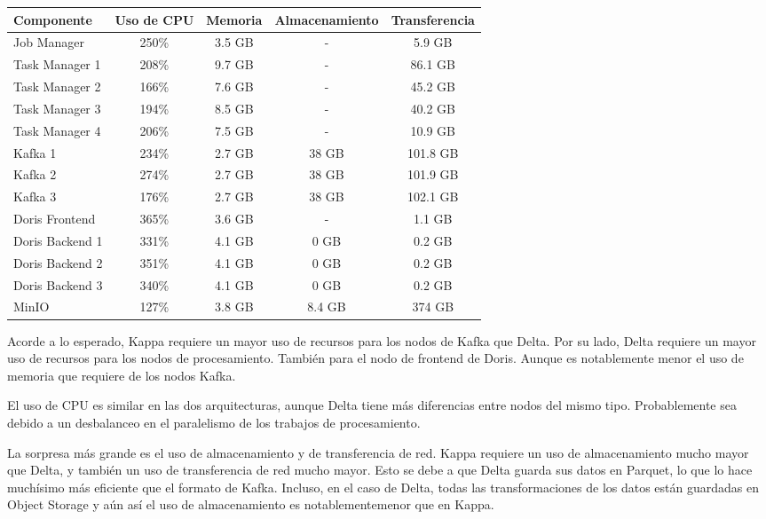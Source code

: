 \begin{longtable}{|p{3cm}|c|c|c|c|}
    \hline
    \textbf{Componente} & \textbf{Uso de CPU} & \textbf{Memoria} & \textbf{Almacenamiento} & \textbf{Transferencia} \\
    \hline
    Job Manager & 250\% & 3.5 GB & - & 5.9 GB \\
    \hline
    Task Manager 1 & 208\% & 9.7 GB & - & 86.1 GB \\
    \hline
    Task Manager 2 & 166\% & 7.6 GB & - & 45.2 GB \\
    \hline
    Task Manager 3 & 194\% & 8.5 GB & - & 40.2 GB \\
    \hline
    Task Manager 4 & 206\% & 7.5 GB & - & 10.9 GB \\
    \hline
    Kafka 1 & 234\% & 2.7 GB & 38 GB & 101.8 GB \\
    \hline
    Kafka 2 & 274\% & 2.7 GB & 38 GB & 101.9 GB \\
    \hline
    Kafka 3 & 176\% & 2.7 GB & 38 GB & 102.1 GB \\
    \hline
    Doris Frontend & 365\% & 3.6 GB & - & 1.1 GB \\
    \hline
    Doris Backend 1 & 331\% & 4.1 GB & 0 GB & 0.2 GB \\
    \hline
    Doris Backend 2 & 351\% & 4.1 GB & 0 GB & 0.2 GB \\
    \hline
    Doris Backend 3 & 340\% & 4.1 GB & 0 GB & 0.2 GB \\
    \hline 
    MinIO & 127\% & 3.8 GB & 8.4 GB & 374 GB \\
    \hline
\end{longtable}

\newpage

Acorde a lo esperado, Kappa requiere un mayor uso de recursos para los nodos de Kafka que Delta.
Por su lado, Delta requiere un mayor uso de recursos para los nodos de procesamiento. También para el nodo de frontend de Doris. 
Aunque es notablemente menor el uso de memoria que requiere de los nodos Kafka. \newline

El uso de CPU es similar en las dos arquitecturas, aunque Delta tiene más diferencias entre nodos del mismo tipo. 
Probablemente sea debido a un desbalanceo en el paralelismo de los trabajos de procesamiento. \newline 

La sorpresa más grande es el uso de almacenamiento y de transferencia de red. 
Kappa requiere un uso de almacenamiento mucho mayor que Delta, y también un uso de transferencia de red mucho mayor.
Esto se debe a que Delta guarda sus datos en Parquet, lo que lo hace muchísimo más eficiente que el formato de Kafka.
Incluso, en el caso de Delta, todas las transformaciones de los datos están guardadas en Object Storage 
y aún así el uso de almacenamiento es notablementemenor que en Kappa. 

